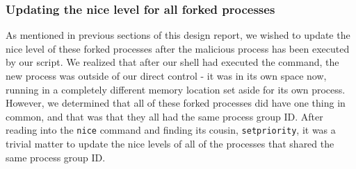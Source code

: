 \documentclass{article}
\begin{document}
\subsubsection{Updating the nice level for all forked processes}
As mentioned in previous sections of this design report, we wished to update
the nice level of these forked processes after the malicious process has been
executed by our script. We realized that after our shell had executed the 
command, the new process was outside of our direct control - it was in its own
space now, running in a completely different memory location set aside for its
own process. \\
However, we determined that all of these forked processes did have one thing in
common, and that was that they all had the same process group ID. After reading
into the \verb+nice+ command and finding its cousin, \verb+setpriority+, it was
a trivial matter to update the nice levels of all of the processes that shared
the same process group ID.
\end{document}
